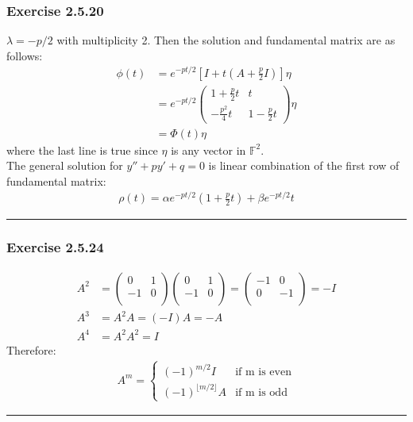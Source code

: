 \documentclass[12pt, letterpaper]{scrartcl}
\begin{document}
\subsubsection*{Exercise 2.5.20}
$\lambda=-p/2$ with multiplicity 2. Then the solution and fundamental matrix are as follows:
\begin{align*}
    \phi(t)&=e^{-pt/2}[I+t(A+\frac{p}{2}I)]\eta\\
    &=e^{-pt/2}\left(\begin{array}{cc}
        1+\frac{p}{2}t & t \\
        -\frac{p^2}{4}t & 1-\frac{p}{2}t 
    \end{array}\right)\eta\\
    &=\Phi(t)\eta
\end{align*}
where the last line is true since $\eta$ is any vector in $\mathbb{F}^2$.\\
The general solution for $y''+py'+q=0$ is linear combination of the first row of fundamental matrix:
\begin{align*}
    \rho(t)=\alpha e^{-pt/2}(1+\frac{p}{2}t)+\beta e^{-pt/2}t
\end{align*}
\vskip1mm\hrule

\subsubsection*{Exercise 2.5.24}
\begin{align*}
    A^2&=
    \left(\begin{array}{cc}
        0 & 1 \\
        -1 & 0 \\
    \end{array}\right)
    \left(\begin{array}{cc}
        0 & 1 \\
        -1 & 0 \\
    \end{array}\right)=
    \left(\begin{array}{cc}
        -1 & 0 \\
        0 & -1 \\
    \end{array}\right)=-I\\
    A^3&=A^2A=(-I)A=-A\\
    A^4&=A^2A^2=I
\end{align*}
Therefore:
\begin{align*}
A^m=
    \begin{cases}
        (-1)^{m/2}I & \text{if m is even}\\
        (-1)^{\lfloor m/2\rfloor}A & \text{if m is odd} 
    \end{cases}
\end{align*}
\vskip1mm\hrule
\end{document}
